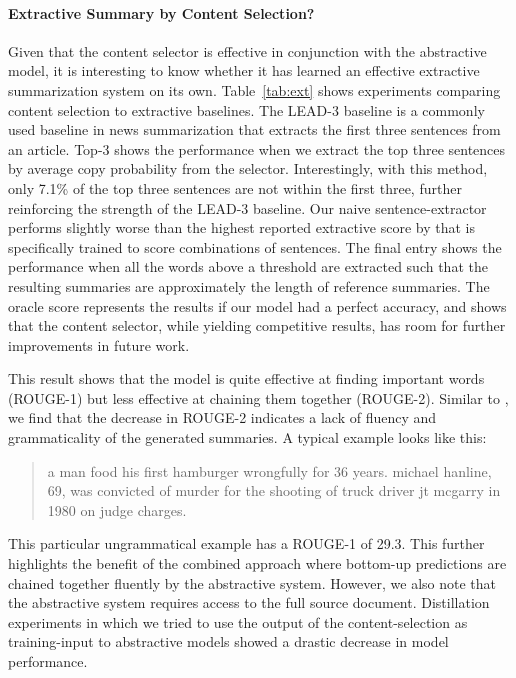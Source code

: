 \documentclass[11pt,a4paper]{article}
\begin{document}
\paragraph{Extractive Summary by Content Selection?}
\label{sec:ext}
Given that the content selector is effective in conjunction with the abstractive model, it is interesting to know whether it has learned an effective extractive summarization system on its
own. Table~\ref{tab:ext} shows experiments comparing content selection to extractive baselines. 
The LEAD-3 baseline is a commonly used baseline in news summarization that extracts the first three sentences from an article. Top-3 shows the performance when we extract the top three sentences by average copy probability from the selector. Interestingly, with this method, only 7.1\% of the top three sentences are not within the first three, further reinforcing the strength of the LEAD-3 baseline. Our naive sentence-extractor performs slightly worse than the highest reported extractive score by \citet{zhou2018neural} that is specifically trained to score combinations of sentences.  
The final entry shows the performance when all the words above a threshold are extracted such that the resulting summaries are approximately the length of reference summaries. The oracle score represents the results if our model had a perfect accuracy, and shows that the content selector, while yielding competitive results, has room for further improvements in future work. 

This result shows that the model is quite effective at finding important words (ROUGE-1) but less effective at chaining them together (ROUGE-2). Similar to \citet{paulus2017deep}, we find that the decrease in ROUGE-2 indicates a lack of fluency and grammaticality of the generated summaries. A typical example looks like this:

\begin{quote}
a man food his first hamburger wrongfully for 36 years. michael hanline, 69, was convicted of murder for the shooting of truck driver jt mcgarry in 1980 on judge charges.
\end{quote}

\noindent This particular ungrammatical example has a ROUGE-1 of 29.3. This further highlights the benefit of the combined approach where bottom-up predictions are chained together fluently by the abstractive system. However, we also note that the abstractive system requires access to the full source document. Distillation experiments in which we tried to use the output of the content-selection as training-input to abstractive models showed a drastic decrease in model performance.
\end{document}
